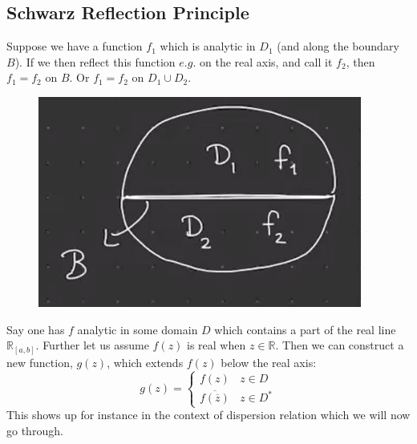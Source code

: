 \documentclass[a4paper,12pt]{article}
\begin{document}
\subsection{Schwarz Reflection Principle}
Suppose we have a function $f_1$ which is analytic in $D_1$ (and along the boundary $B$). If we then reflect this function $e.g.$ on the real axis, and call it $f_2$, then $f_1=f_2$ on $B$. Or $f_1=f_2$ on $D_1\cup D_2$.
\begin{figure}[H]
	\centering
	\includegraphics[width=0.3\linewidth]{21}
	\caption{}
	\label{fig:4}
\end{figure}
Say one has $f$ analytic in some domain $D$ which contains a part of the real line $\mathds R_{[a,b]}$. Further let us assume $f(z)$ is real when $z\in \mathds{R}$. Then we can construct a new function, $g(z)$, which extends $f(z)$ below the real axis:
\begin{equation}
g(z)=\begin{cases}
f(z)~~~~z\in D\\
\overline{f(\overline{z})}~~~~z\in D^*
\end{cases}
\end{equation}
This shows up for instance in the context of dispersion relation which we will now go through.
\end{document}
